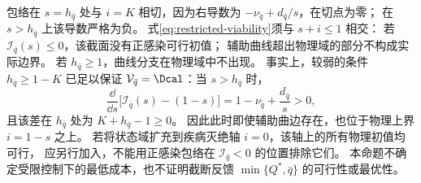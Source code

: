 \begin{remark}[切点、物理截断与退化情形]
\label{rem:restricted-degeneracies}
包络在 $s=h_{\bar q}$ 处与 $i=K$ 相切，因为右导数为
$-\nu_{\bar q}+d_{\bar q}/s$，在切点为零；
在 $s>h_{\bar q}$ 上该导数严格为负。
式\eqref{eq:restricted-viability}须与 $s+i\le1$ 相交：
若 $\mathcal I_{\bar q}(s)\le0$，该截面没有正感染可行初值；
辅助曲线超出物理域的部分不构成实际边界。
若 $h_{\bar q}\ge1$，曲线分支在物理域中不出现。
事实上，较弱的条件 $h_{\bar q}\ge1-K$ 已足以保证
$\mathcal V_{\bar q}=\Dcal$：当 $s>h_{\bar q}$ 时，
\[
 \frac{\dd}{\dd s}\bigl[\mathcal I_{\bar q}(s)-(1-s)\bigr]
 =1-\nu_{\bar q}+\frac{d_{\bar q}}s>0,
\]
且该差在 $h_{\bar q}$ 处为 $K+h_{\bar q}-1\ge0$。
因此此时即使辅助曲边存在，也位于物理上界 $i=1-s$ 之上。
若将状态域扩充到疾病灭绝轴 $i=0$，该轴上的所有物理初值均可行，
应另行加入，不能用正感染包络在 $\mathcal I_{\bar q}<0$ 的位置排除它们。
本命题不确定受限控制下的最低成本，也不证明截断反馈
$\min\{Q^*,\bar q\}$ 的可行性或最优性。
\end{remark}
